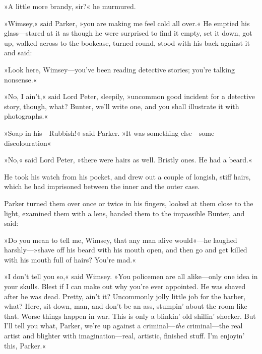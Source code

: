 »A little more brandy, sir?« he murmured.

»Wimsey,« said Parker, »you are making me feel cold all over.« He emptied his glass—stared at it as though he were surprised to find it empty, set it down, got up, walked across to the bookcase, turned round, stood with his back against it and said:

»Look here, Wimsey—you've been reading detective stories; you're talking nonsense.«

»No, I ain't,« said Lord Peter, sleepily, »uncommon good incident for a detective story, though, what? Bunter, we'll write one, and you shall illustrate it with photographs.«

»Soap in his—Rubbish!« said Parker. »It was something else—some discolouration\longdash«

»No,« said Lord Peter, »there were hairs as well. Bristly ones. He had a beard.«

He took his watch from his pocket, and drew out a couple of longish, stiff hairs, which he had imprisoned between the inner and the outer case.

Parker turned them over once or twice in his fingers, looked at them close to the light, examined them with a lens, handed them to the impassible Bunter, and said:

»Do you mean to tell me, Wimsey, that any man alive would«---he laughed harshly---»shave off his beard with his mouth open, and then go and get killed with his mouth full of hairs? You're mad.«

»I don't tell you so,« said Wimsey. »You policemen are all alike—only one idea in your skulls. Blest if I can make out why you're ever appointed. He was shaved after he was dead. Pretty, ain't it? Uncommonly jolly little job for the barber, what? Here, sit down, man, and don't be an ass, stumpin' about the room like that. Worse things happen in war. This is only a blinkin' old shillin' shocker. But I'll tell you what, Parker, we're up against a criminal---\textit{the} criminal—the real artist and blighter with imagination—real, artistic, finished stuff. I'm enjoyin' this, Parker.«